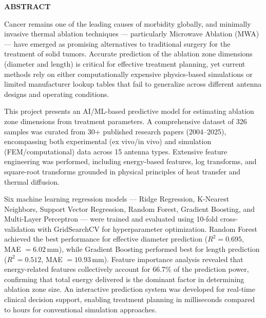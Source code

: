 \documentclass[12pt,a4wide]{report}
\theoremstyle{plain}
\theoremstyle{definition}
\theoremstyle{remark}
\begin{document}
\clearpage


\begin{center}
{\Large{\bf{ABSTRACT}}}
\end{center}


Cancer remains one of the leading causes of morbidity globally, and minimally invasive thermal ablation techniques --- particularly Microwave Ablation (MWA) --- have emerged as promising alternatives to traditional surgery for the treatment of solid tumors. Accurate prediction of the ablation zone dimensions (diameter and length) is critical for effective treatment planning, yet current methods rely on either computationally expensive physics-based simulations or limited manufacturer lookup tables that fail to generalize across different antenna designs and operating conditions.

This project presents an AI/ML-based predictive model for estimating ablation zone dimensions from treatment parameters. A comprehensive dataset of 326 samples was curated from 30+ published research papers (2004--2025), encompassing both experimental (ex vivo/in vivo) and simulation (FEM/computational) data across 15 antenna types. Extensive feature engineering was performed, including energy-based features, log transforms, and square-root transforms grounded in physical principles of heat transfer and thermal diffusion.

Six machine learning regression models --- Ridge Regression, K-Nearest Neighbors, Support Vector Regression, Random Forest, Gradient Boosting, and Multi-Layer Perceptron --- were trained and evaluated using 10-fold cross-validation with GridSearchCV for hyperparameter optimization. Random Forest achieved the best performance for effective diameter prediction ($R^2 = 0.695$, MAE $= 6.02$\,mm), while Gradient Boosting performed best for length prediction ($R^2 = 0.512$, MAE $= 10.93$\,mm). Feature importance analysis revealed that energy-related features collectively account for 66.7\% of the prediction power, confirming that total energy delivered is the dominant factor in determining ablation zone size. An interactive prediction system was developed for real-time clinical decision support, enabling treatment planning in milliseconds compared to hours for conventional simulation approaches.

\clearpage
\end{document}
